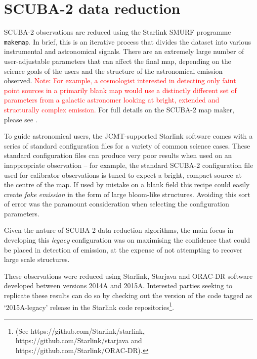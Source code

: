 \documentclass[twocolumn,times]{aastex6}
\newcommand{\note}[1]{\textcolor{red}{Note: #1}}
\begin{document}
\section{SCUBA-2 data reduction}
\label{sec:dr}
SCUBA-2 observations are reduced using the Starlink SMURF programme
\texttt{makemap}. In brief, this is an iterative process that divides
the dataset into various instrumental and astronomical signals. There
are an extremely large number of user-adjustable parameters that can
affect the final map, depending on the science goals of the users and
the structure of the astronomical emission observed. \note{For example, a
cosmologist interested in detecting only faint point sources in a
primarily blank map would use a distinctly different set of parameters
from a galactic astronomer looking at bright, extended and
structurally complex emission.} For full details on the SCUBA-2 map
maker, please see \citet{Chapin2013}.


To guide astronomical users, the JCMT-supported Starlink software
comes with a series of standard configuration files for a variety of
common science cases.
These standard configuration files can produce very poor results when
used on an inappropriate observation -- for example, the standard
SCUBA-2 configuration file used for calibrator observations is tuned
to expect a bright, compact source at the centre of the map. If used
by mistake on a blank field this recipe could easily create \emph{fake
  emission} in the form of large bloom-like structures. Avoiding this
sort of error was the paramount consideration when selecting the
configuration parameters.

Given the nature of SCUBA-2 data reduction algorithms, the main focus
in developing this \emph{legacy} configuration was on maximising the
confidence that could be placed in detection of emission, at the
expense of not attempting to recover large scale structures.

These observations were reduced using Starlink, Starjava and ORAC-DR
software developed between versions 2014A and 2015A. Interested
parties seeking to replicate these results can do so by checking out
the version of the code tagged as `2015A-legacy' release in the
Starlink code repositories\footnote{(See
  https://github.com/Starlink/starlink,
  https://github.com/Starlink/starjava and
  https://github.com/Starlink/ORAC-DR).}.
\end{document}

